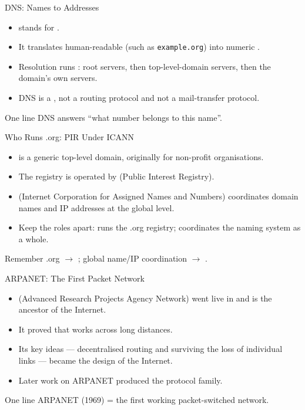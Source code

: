 \documentclass[aspectratio=169]{beamer}
\begin{document}
\begin{frame}{DNS: Names to Addresses}
  \begin{itemize}
    \item {} stands for .
    \item It translates human-readable  (such as
      \texttt{example.org}) into numeric .
    \item Resolution runs : root servers, then
      top-level-domain servers, then the domain's own servers.
    \item DNS is a , not a routing protocol and not a
      mail-transfer protocol.
  \end{itemize}
  \begin{block}{One line}
    DNS answers ``what number belongs to this name''.
  \end{block}
\end{frame}

\begin{frame}{Who Runs .org: PIR Under ICANN}
  \begin{itemize}
    \item {} is a generic top-level domain, originally for
      non-profit organisations.
    \item The  registry is operated by  (Public Interest
      Registry).
    \item {} (Internet Corporation for Assigned Names and Numbers)
      coordinates domain names and IP addresses at the global level.
    \item Keep the roles apart:  runs the .org registry;
       coordinates the naming system as a whole.
  \end{itemize}
  \begin{block}{Remember}
    .org $\rightarrow$ ; global name/IP coordination $\rightarrow$
    .
  \end{block}
\end{frame}

\begin{frame}{ARPANET: The First Packet Network}
  \begin{itemize}
    \item {} (Advanced Research Projects Agency Network) went live
      in  and is the ancestor of the Internet.
    \item It proved that  works across long distances.
    \item Its key ideas --- decentralised routing and surviving the loss of
      individual links --- became the design of the Internet.
    \item Later work on ARPANET produced the  protocol family.
  \end{itemize}
  \begin{block}{One line}
    ARPANET (1969) = the first working packet-switched network.
  \end{block}
\end{frame}
\end{document}

